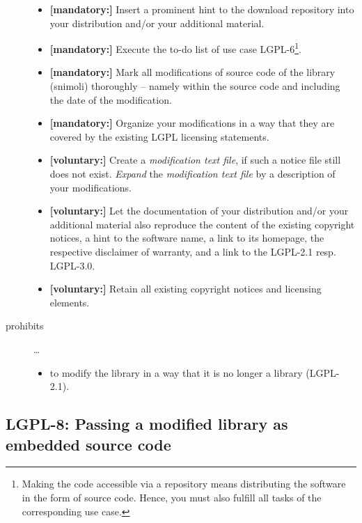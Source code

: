 \begin{description}
\begin{itemize}
  \item \textbf{[mandatory:]} Insert a prominent hint to the download repository
  into your distribution and/or your additional material.
  
  \item \textbf{[mandatory:]} Execute the to-do list of use case LGPL-6\footnote{
  Making the code accessible via a repository means distributing the software in
  the form of source code. Hence, you must also fulfill all tasks of the
  corresponding use case.}.

  \item \textbf{[mandatory:]} Mark all modifications of source code of the
  library (snimoli) thoroughly -- namely within the source code and including
  the date of the modification.
  
  \item \textbf{[mandatory:]} Organize your modifications in a way that they are
  covered by the existing LGPL licensing statements.

  \item \textbf{[voluntary:]} Create a \emph{modification text file}, if such a
  notice file still does not exist. \emph{Expand} the \emph{modification text
  file} by a description of your modifications.

  \item \textbf{[voluntary:]} Let the documentation of your distribution and/or
  your additional material also reproduce the content of the existing
  copyright notices, a hint to the software name, a link to its homepage,
  the respective disclaimer of warranty, and a link to the LGPL-2.1 resp.
  LGPL-3.0.
  
  \item \textbf{[voluntary:]} Retain all existing copyright notices and
  licensing elements. 
  
\end{itemize}

\item[prohibits] \ldots
\begin{itemize}
  \item to modify the library in a way that it is no longer a library
  (LGPL-2.1).
\end{itemize}

\end{description}

\subsection{LGPL-8: Passing a modified library as embedded source code}
\label{OSUC-10S-LGPL}

